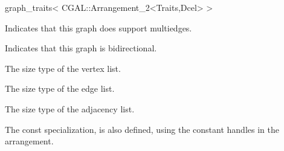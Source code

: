 \begin{ccRefClass}{graph_traits< CGAL::Arrangement_2<Traits,Dcel> >}
  
  {Indicates that this graph does support multiedges.}
  
    {Indicates that this graph is bidirectional.}
    
    {The size type of the vertex list.}
    
    {The size type of the edge list.}
    
    {The size type of the adjacency list.}

The const specialization,  
is also defined, using the constant handles in the arrangement.
     
\end{ccRefClass}
